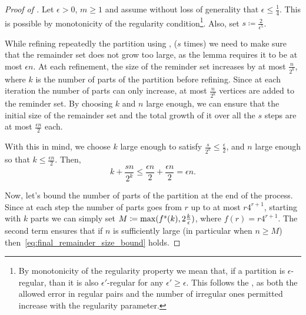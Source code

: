         \begin{proof}[Proof of ]
            Let $\epsilon > 0$, $m \geq 1$ and assume without loss of generality that $\epsilon \leq \frac{1}{4}$.
            This is possible by monotonicity of the regularity condition\footnote{
                By monotonicity of the regularity property we mean that, if a partition is $\epsilon$-regular,
                than it is also $\epsilon'$-regular for any $\epsilon' \geq \epsilon$.
                This follows the , as both the allowed error in
                regular pairs and the number of irregular ones permitted increase with the regularity parameter.}.
            Also, set $s \coloneqq \frac{2}{\epsilon^5}$.

            While refining repeatedly the partition using ,
            ($s$ times) we need to make sure that the remainder set does not grow too large, as the lemma requires it to
            be at most $\epsilon n$.
            At each refinement, the size of the reminder set increases by at most $\frac{n}{2^k}$, where $k$ is the
            number of parts of the partition before refining.
            Since at each iteration the number of parts can only increase, at most $\frac{n}{2^k}$ vertices
            are added to the reminder set.
            By choosing $k$ and $n$ large enough, we can ensure that the initial size of the remainder set and the
            total growth of it over all the $s$ steps are at most $\frac{\epsilon n}{2}$ each.

            With this in mind, we choose $k$ large enough to satisfy $\frac{s}{2^k} \leq \frac{\epsilon}{2}$, and
            $n$ large enough so that $k \leq \frac{\epsilon n}{2}$.
            Then,
            \begin{equation} \label{eq:final_remainder_size_bound}
                k + \frac{s n}{2^k} \leq \frac{\epsilon n}{2} + \frac{\epsilon n}{2} = \epsilon n.
            \end{equation}

            Now, let's bound the number of parts of the partition at the end of the process.
            Since at each step the number of parts goes from $r$ up to at most $r 4^{r+1}$, starting with $k$ parts
            we can simply set $M \coloneqq \max( f^s(k), 2\frac{k}{\epsilon} )$, where $f(r) = r 4^{r+1}$.
            The second term ensures that if $n$ is sufficiently large (in particular when $n \geq M$)
            then~\eqref{eq:final_remainder_size_bound} holds.


\end{proof}
